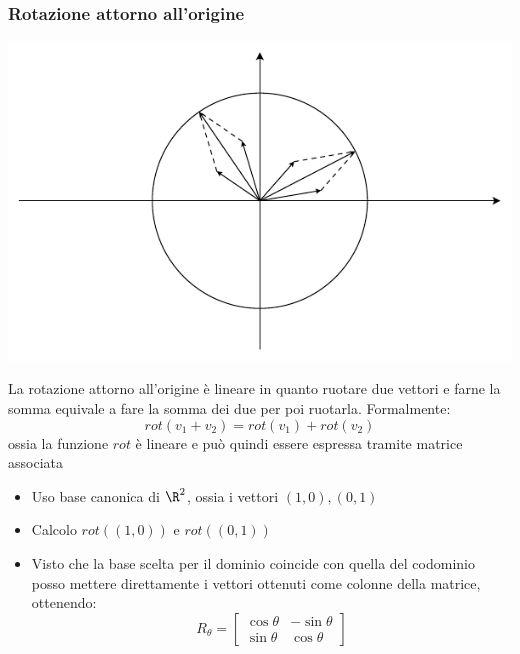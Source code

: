 \subsubsection*{Rotazione attorno all'origine}
\begin{center}
	\includegraphics{Images/Rotazione.pdf}
\end{center}
La rotazione attorno all'origine è lineare in quanto ruotare due vettori e farne la somma equivale a fare la somma dei due per poi ruotarla. Formalmente:
\[
	rot\left( v_1+v_2 \right) = rot\left( v_1 \right)  + rot\left( v_2 \right)
\]
ossia la funzione $ rot $ è lineare e può quindi essere espressa tramite matrice associata
\begin{itemize}
	\item Uso base canonica di $ \R^{2} $, ossia i vettori $ \left( 1,0 \right) , \left( 0,1 \right)  $
	\item Calcolo $ rot\left( \left( 1,0 \right)  \right)  $ e $ rot\left( \left( 0,1 \right)  \right)  $
	\item Visto che la base scelta per il dominio coincide con quella del codominio posso mettere direttamente i vettori ottenuti come colonne della matrice, ottenendo:
	      \[
		      R_{\theta }=\begin{bmatrix}
			      \cos \theta & - \sin \theta \\
			      \sin \theta & \cos \theta
		      \end{bmatrix}
	      \]
\end{itemize}
